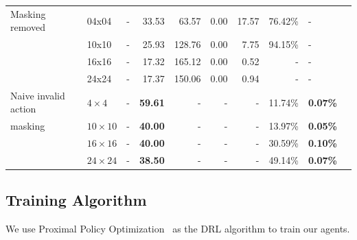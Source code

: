 \documentclass[letterpaper]{article}
\begin{document}
\begin{table}[tb]
\begin{small}
\begin{tabular}{lllrrrrrll}
Masking removed & 04x04 &  - &                  33.53 &                          63.57 &                                0.00 &                               17.57 &                 76.42\% &                 - \\
                             & 10x10 &  - &                  25.93 &                         128.76 &                                0.00 &                                7.75 &                 94.15\% &                 - \\
                             & 16x16 &  - &                  17.32 &                         165.12 &                                0.00 &                                0.52 &                - &                - \\
                             & 24x24 &  - &                  17.37 &                         150.06 &                                0.00 &                                0.94 &                - &                - \\ \midrule
Naive invalid action  & $4\times4$ &  - &                  \textbf{59.61} &                          - &                                - &                                - &                 11.74\% &                 \textbf{0.07\%} \\
masking                             & $10\times10$ &  - &                  \textbf{40.00} &                           - &                                - &                                - &                 13.97\% &                 \textbf{0.05\%} \\
                             & $16\times16$ &  - &                  \textbf{40.00} &                           - &                                - &                                - &                 30.59\% &                 \textbf{0.10\%} \\
                             & $24\times24$ &  - &                  \textbf{38.50} &                           - &                                - &                                - &                 49.14\% &                 \textbf{0.07\%} \\
\bottomrule
\end{tabular}
\end{small}
    \label{tab:all_results}
\end{table}






\subsection{Training Algorithm}
We use Proximal Policy Optimization~\cite{schulman2017proximal} as the DRL algorithm to train our agents.
\end{document}
